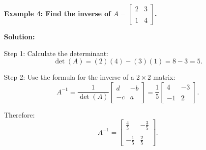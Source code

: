 \begin{flushleft}
\textbf{Example 4: Find the inverse of $A = \begin{bmatrix} 2 & 3 \\\\ 1 & 4 \end{bmatrix}$.}

\vspace{0.5cm}
\textbf{Solution:}
\vspace{0.5cm}

Step 1: Calculate the determinant:
\[
\det(A) = (2)(4) - (3)(1) = 8 - 3 = 5.
\]

Step 2: Use the formula for the inverse of a $2 \times 2$ matrix:
\[
A^{-1} = \frac{1}{\det(A)} \begin{bmatrix} d & -b \\\\ -c & a \end{bmatrix} = \frac{1}{5} \begin{bmatrix} 4 & -3 \\\\ -1 & 2 \end{bmatrix}.
\]

Therefore:
\[
A^{-1} = \begin{bmatrix} \frac{4}{5} & -\frac{3}{5} \\\\ -\frac{1}{5} & \frac{2}{5} \end{bmatrix}.
\]
\end{flushleft}

